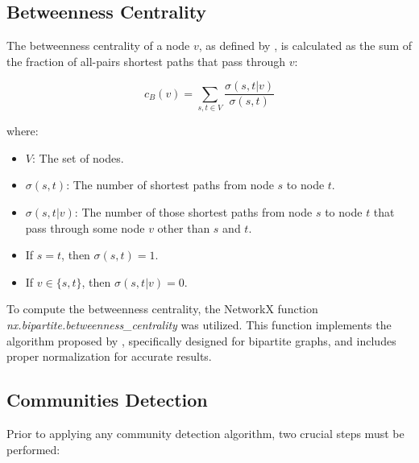 
\subsection{Betweenness Centrality}
The betweenness centrality of a node \(v\), as defined by  \cite{Brandes_2008},
is calculated as the sum of the fraction of all-pairs shortest paths that pass through \(v\):

\begin{equation}
    c_B(v) = \sum_{s,t \in V} \frac{\sigma(s, t|v)}{\sigma(s, t)} \label{eq:betweenness}
\end{equation}

where:

\begin{itemize}
    \setlength\itemsep{0.4em} %
    \item \(V\): The set of nodes.
    \item \(\sigma(s, t)\): The number of shortest paths from node \(s\) to node \(t\).
    \item \(\sigma(s, t|v)\): The number of those shortest paths from node \(s\) to node \(t\) that pass
          through some node \(v\) other than \(s\) and \(t\).
    \item If \(s = t\), then \(\sigma(s, t) = 1\).
    \item If \(v \in \{s, t\}\), then \(\sigma(s, t|v) = 0\).
\end{itemize}

To compute the betweenness centrality, the NetworkX function \textit{nx.bipartite.betweenness\_centrality}
was utilized. This function implements the algorithm proposed by  \cite{Brandes_2004},
specifically designed for bipartite graphs, and includes proper normalization for accurate results.

\subsection{Communities Detection}
Prior to applying any community detection algorithm, two crucial steps must be performed:


